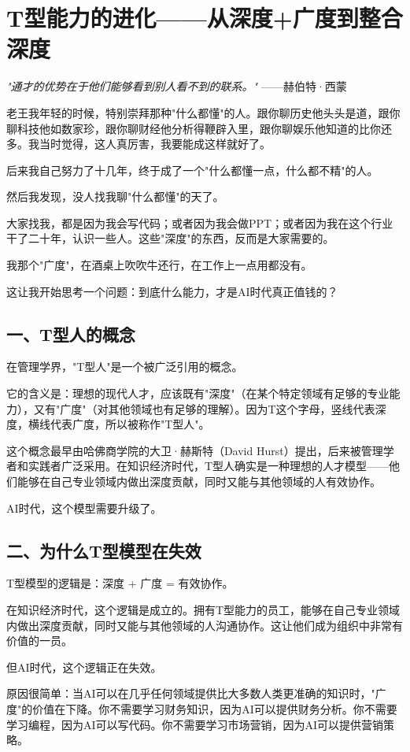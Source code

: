 \chapter{T型能力的进化——从深度+广度到整合深度}


\textit{"通才的优势在于他们能够看到别人看不到的联系。"}
——赫伯特·西蒙


老王我年轻的时候，特别崇拜那种"什么都懂"的人。跟你聊历史他头头是道，跟你聊科技他如数家珍，跟你聊财经他分析得鞭辟入里，跟你聊娱乐他知道的比你还多。我当时觉得，这人真厉害，我要能成这样就好了。

后来我自己努力了十几年，终于成了一个"什么都懂一点，什么都不精"的人。

然后我发现，没人找我聊"什么都懂"的天了。

大家找我，都是因为我会写代码；或者因为我会做PPT；或者因为我在这个行业干了二十年，认识一些人。这些"深度"的东西，反而是大家需要的。

我那个"广度"，在酒桌上吹吹牛还行，在工作上一点用都没有。

这让我开始思考一个问题：到底什么能力，才是AI时代真正值钱的？

\section{一、T型人的概念}


在管理学界，"T型人"是一个被广泛引用的概念。

它的含义是：理想的现代人才，应该既有"深度"（在某个特定领域有足够的专业能力），又有"广度"（对其他领域也有足够的理解）。因为T这个字母，竖线代表深度，横线代表广度，所以被称作"T型人"。

这个概念最早由哈佛商学院的大卫·赫斯特（David Hurst）提出，后来被管理学者和实践者广泛采用。在知识经济时代，T型人确实是一种理想的人才模型——他们能够在自己专业领域内做出深度贡献，同时又能与其他领域的人有效协作。

AI时代，这个模型需要升级了。

\section{二、为什么T型模型在失效}


T型模型的逻辑是：深度 + 广度 = 有效协作。

在知识经济时代，这个逻辑是成立的。拥有T型能力的员工，能够在自己专业领域内做出深度贡献，同时又能与其他领域的人沟通协作。这让他们成为组织中非常有价值的一员。

但AI时代，这个逻辑正在失效。

原因很简单：当AI可以在几乎任何领域提供比大多数人类更准确的知识时，"广度"的价值在下降。你不需要学习财务知识，因为AI可以提供财务分析。你不需要学习编程，因为AI可以写代码。你不需要学习市场营销，因为AI可以提供营销策略。

